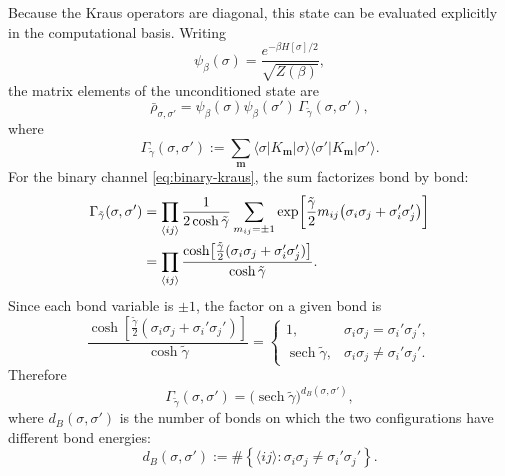 \documentclass[11pt]{article}
\newcommand{\ket}[1]{\lvert #1\rangle}
\newcommand{\bra}[1]{\langle #1\rvert}
\newcommand{\set}[1]{\left\{ #1 \right\}}
\newcommand{\sech}{\operatorname{sech}}
\begin{document}
Because the Kraus operators are diagonal, this state can be evaluated explicitly in the computational basis. Writing
\begin{equation}
\psi_\beta(\sigma)
=
\frac{e^{-\beta H[\sigma]/2}}{\sqrt{Z(\beta)}},
\end{equation}
the matrix elements of the unconditioned state are
\begin{equation}
\bar\rho_{\sigma,\sigma'}
=
\psi_\beta(\sigma)\psi_\beta(\sigma')\,
\Gamma_{\tilde\gamma}(\sigma,\sigma'),
\label{eq:rho-bar-general}
\end{equation}
where
\begin{equation}
\Gamma_{\tilde\gamma}(\sigma,\sigma')
:=
\sum_{\bm m}
\bra{\sigma}K_{\bm m}\ket{\sigma}
\bra{\sigma'}K_{\bm m}\ket{\sigma'}.
\label{eq:gamma-kernel-def}
\end{equation}
For the binary channel \eqref{eq:binary-kraus}, the sum factorizes bond by bond:
\begin{align}
\Gamma_{\tilde\gamma}(\sigma,\sigma')
&=
\prod_{\langle ij\rangle}
\frac{1}{2\cosh\tilde\gamma}
\sum_{m_{ij}=\pm1}
\exp\!\left[
\frac{\tilde\gamma}{2}m_{ij}
\bigl(\sigma_i\sigma_j+\sigma_i'\sigma_j'\bigr)
\right]
\notag\\
&=
\prod_{\langle ij\rangle}
\frac{\cosh\!\left[
\frac{\tilde\gamma}{2}
(\sigma_i\sigma_j+\sigma_i'\sigma_j')
\right]}{\cosh\tilde\gamma}.
\label{eq:gamma-kernel-step}
\end{align}
Since each bond variable is $\pm1$, the factor on a given bond is
\begin{equation}
\frac{\cosh\!\left[
\frac{\tilde\gamma}{2}
(\sigma_i\sigma_j+\sigma_i'\sigma_j')
\right]}{\cosh\tilde\gamma}
=
\begin{cases}
1, & \sigma_i\sigma_j = \sigma_i'\sigma_j',\\[4pt]
\sech\tilde\gamma, & \sigma_i\sigma_j \neq \sigma_i'\sigma_j'.
\end{cases}
\label{eq:single-bond-factor}
\end{equation}
Therefore
\begin{equation}
\Gamma_{\tilde\gamma}(\sigma,\sigma')
=
\bigl(\sech\tilde\gamma\bigr)^{d_B(\sigma,\sigma')},
\label{eq:exact-decoherence-kernel}
\end{equation}
where $d_B(\sigma,\sigma')$ is the number of bonds on which the two configurations have different bond energies:
\begin{equation}
d_B(\sigma,\sigma')
:=
\#\set{\langle ij\rangle: \sigma_i\sigma_j \neq \sigma_i'\sigma_j'}.
\label{eq:bond-distance}
\end{equation}
\end{document}
